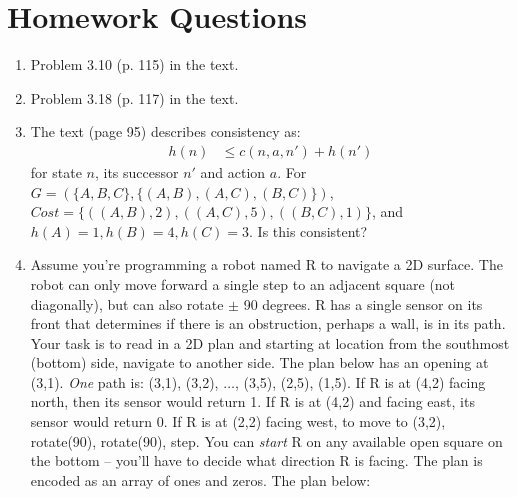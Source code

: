 \documentclass{article}
\begin{document}
\section*{Homework Questions}
\begin{enumerate}
\item Problem 3.10 (p. 115) in the text.
\item Problem 3.18 (p. 117) in the text.
\item The text (page 95) describes consistency as:
\begin{eqnarray*}
h(n) &\leq c(n,a,n') + h(n')
\end{eqnarray*}
for state $n$, its successor $n'$ and action $a$.  For $G = (\{A,B,C\},\{(A,B), (A,C), (B,C)\})$, $Cost = \{((A,B),2), ((A,C),5), ((B,C), 1)\}$, and $h(A) = 1, h(B) = 4, h(C) = 3$. Is this consistent?
  

\item Assume you're programming a robot named \textsf{R} to navigate a 2D surface.  The robot can only move forward a single step to an adjacent square (not diagonally), but can also rotate $\pm$ 90 degrees.  \textsf{R} has a single sensor on its front that determines if there is an obstruction, perhaps a wall, is in its path.  Your task is to read in a 2D plan and starting at location from the southmost (bottom) side, navigate to another side.  The plan below has an opening at (3,1).  {\it One} path is: (3,1), (3,2), $\ldots$, (3,5), (2,5), (1,5).  If \textsf{R} is at (4,2) facing north, then its sensor would return 1.  If \textsf{R} is at (4,2) and facing east, its sensor would return 0.  If \textsf{R} is at (2,2) facing west, to move to (3,2), rotate(90), rotate(90), step.  You can {\it start} \textsf{R} on any available open square on the bottom -- you'll have to decide what direction \textsf{R} is facing.  The plan is encoded as an array of ones and zeros.  The plan below:

\begin{center}
{\small
{}}
\end{center}


\end{enumerate}
\end{document}
